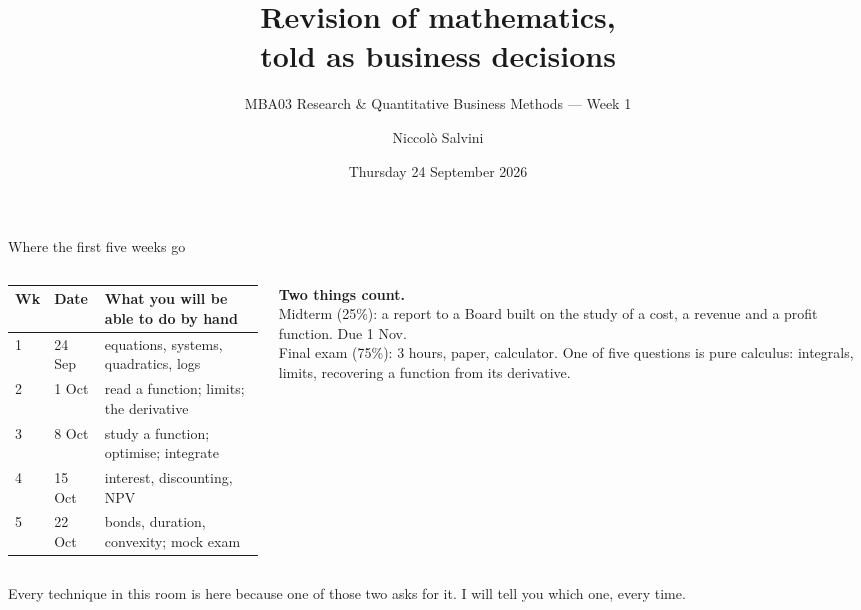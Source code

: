 \documentclass[aspectratio=169,11pt]{beamer}
\title{Revision of mathematics,\\told as business decisions}
\subtitle{MBA03 Research \& Quantitative Business Methods --- Week 1}
\author{Niccolò Salvini}
\institute{European School of Economics, Florence}
\date{Thursday 24 September 2026}
\begin{document}
\maketitle

\begin{frame}{Where the first five weeks go}
  \begin{columns}[T]
  \begin{column}{0.58\textwidth}
    \begin{tabular}{@{}lll@{}}\toprule
    Wk & Date & What you will be able to do by hand \\ \midrule
    1 & 24 Sep & equations, systems, quadratics, logs \\
    2 & 1 Oct & read a function; limits; the derivative \\
    3 & 8 Oct & study a function; optimise; integrate \\
    4 & 15 Oct & interest, discounting, NPV \\
    5 & 22 Oct & bonds, duration, convexity; mock exam \\ \bottomrule
    \end{tabular}
  \end{column}
  \begin{column}{0.40\textwidth}
    \textbf{Two things count.}\\[0.3em]
    Midterm (25\%): a report to a Board built on the study of a cost, a revenue and a profit function. Due 1 Nov.\\[0.5em]
    Final exam (75\%): 3 hours, paper, calculator. One of five questions is pure calculus: integrals, limits, recovering a function from its derivative.
  \end{column}
  \end{columns}
  \vspace{0.6em}
  \alert{Every technique in this room is here because one of those two asks for it. I will tell you which one, every time.}
\end{frame}
\end{document}
